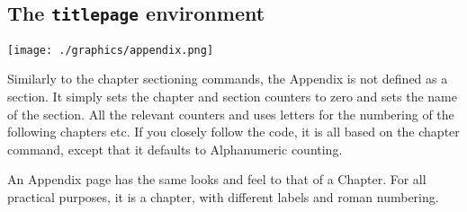 \begin{teX}
\newenvironment{quote}
               {\list{}{\rightmargin\leftmargin}%
                \item\relax}
               {\endlist}




\section{The \protect\texttt{titlepage} environment}
\if@compatibility
\newenvironment{titlepage}
    {%
      \cleardoublepage
      \if@twocolumn
        \@restonecoltrue\onecolumn
      \else
        \@restonecolfalse\newpage
      \fi
      \thispagestyle{empty}%
      \setcounter{page}\z@
    }%
    {\if@restonecol\twocolumn \else \newpage \fi
    }
\else
\newenvironment{titlepage}
    {%
      \cleardoublepage
      \if@twocolumn
        \@restonecoltrue\onecolumn
      \else
        \@restonecolfalse\newpage
      \fi
      \thispagestyle{empty}%
      \setcounter{page}\@ne
    }%
    {\if@restonecol\twocolumn \else \newpage \fi
     \if@twoside\else
        \setcounter{page}\@ne
     \fi
    }
\fi
\end{teX}



\begin{multicols}{2}
\texttt{[image: ./graphics/appendix.png]}

Similarly to the chapter sectioning commands, the Appendix is not defined as a section. It simply sets the chapter and section counters to zero and sets the name of the section. All the relevant counters and uses letters for the numbering of the following chapters etc. If you closely follow the code, it is all based on the chapter command, except that it defaults to Alphanumeric counting.

\begin{teX}
\newcommand\appendix{\par
  \setcounter{chapter}{0}%
  \setcounter{section}{0}%
  \gdef\@chapapp{\appendixname}(*@\sidenote{The actual literal used for \textbackslash{appendixname} is defined later on, so that you can customize the language}\label{appendixname}@*)
  \gdef\thechapter{\@Alph\c@chapter}}
\end{teX}

An Appendix page has the same looks and feel to that of a Chapter. For all practical purposes, it is a chapter, with different labels and roman numbering.
\end{multicols}

